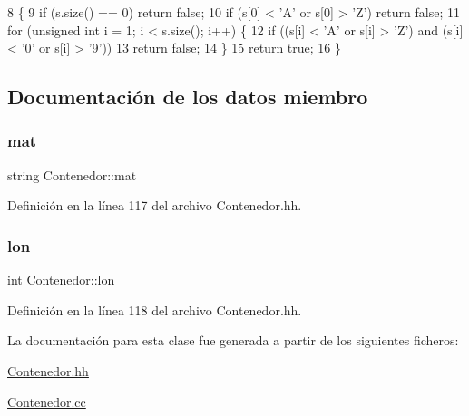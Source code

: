 \begin{DoxyCode}
8 \{ 
9   \textcolor{keywordflow}{if} (s.size() == 0) \textcolor{keywordflow}{return} \textcolor{keyword}{false};
10   \textcolor{keywordflow}{if} (s[0] < \textcolor{charliteral}{'A'} or s[0] > \textcolor{charliteral}{'Z'}) \textcolor{keywordflow}{return} \textcolor{keyword}{false};
11   \textcolor{keywordflow}{for} (\textcolor{keywordtype}{unsigned} \textcolor{keywordtype}{int} i = 1; i < s.size(); i++) \{
12     \textcolor{keywordflow}{if} ((s[i] < \textcolor{charliteral}{'A'} or s[i] > \textcolor{charliteral}{'Z'}) and (s[i] < \textcolor{charliteral}{'0'} or s[i] > \textcolor{charliteral}{'9'}))
13       \textcolor{keywordflow}{return} \textcolor{keyword}{false};
14   \}
15   \textcolor{keywordflow}{return} \textcolor{keyword}{true};
16 \}
\end{DoxyCode}


\subsection{Documentación de los datos miembro}
\mbox{\label{class_contenedor_a219718cff2c0f94314defbf8d747bfa9}} 
\subsubsection{\texorpdfstring{mat}{mat}}
{\footnotesize\ttfamily string Contenedor\+::mat\hspace{0.3cm}{\ttfamily [private]}}



Definición en la línea 117 del archivo Contenedor.\+hh.

\mbox{\label{class_contenedor_a364e04e5a1c7787463981f192f48e4ce}} 
\subsubsection{\texorpdfstring{lon}{lon}}
{\footnotesize\ttfamily int Contenedor\+::lon\hspace{0.3cm}{\ttfamily [private]}}



Definición en la línea 118 del archivo Contenedor.\+hh.



La documentación para esta clase fue generada a partir de los siguientes ficheros\+:\begin{DoxyCompactItemize}
\item 
\hyperlink{_contenedor_8hh}{Contenedor.\+hh}\item 
\hyperlink{_contenedor_8cc}{Contenedor.\+cc}\end{DoxyCompactItemize}

